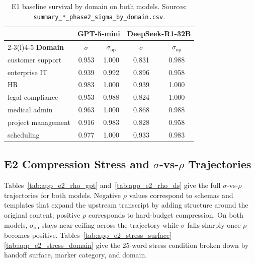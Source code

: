 \begin{table}[h]
\centering
\caption{E1 baseline survival by domain on both models. Sources: \texttt{summary\_*\_phase2\_sigma\_by\_domain.csv}.}
\label{tab:app_e1_domain}
\small
\begin{tabular}{@{}lcccc@{}}
\toprule
& \multicolumn{2}{c}{\textbf{GPT-5-mini}} & \multicolumn{2}{c}{\textbf{DeepSeek-R1-32B}} \\
\cmidrule(lr){2-3}\cmidrule(l){4-5}
\textbf{Domain} & \boldmath$\sigma$ & \boldmath$\sigma_{\mathrm{op}}$ & \boldmath$\sigma$ & \boldmath$\sigma_{\mathrm{op}}$ \\
\midrule
customer support   & 0.953 & 1.000 & 0.831 & 0.988 \\
enterprise IT      & 0.939 & 0.992 & 0.896 & 0.958 \\
HR                 & 0.983 & 1.000 & 0.939 & 1.000 \\
legal compliance   & 0.953 & 0.988 & 0.824 & 1.000 \\
medical admin      & 0.963 & 1.000 & 0.868 & 0.988 \\
project management & 0.916 & 0.983 & 0.828 & 0.958 \\
scheduling         & 0.977 & 1.000 & 0.933 & 0.983 \\
\bottomrule
\end{tabular}
\end{table}

\subsection{E2 Compression Stress and $\sigma$-vs-$\rho$ Trajectories}
\label{app:e2}

Tables~\ref{tab:app_e2_rho_gpt} and~\ref{tab:app_e2_rho_ds} give the full $\sigma$-vs-$\rho$ trajectories for both models. Negative $\rho$ values correspond to schemas and templates that expand the upstream transcript by adding structure around the original content; positive $\rho$ corresponds to hard-budget compression. On both models, $\sigma_{\mathrm{op}}$ stays near ceiling across the trajectory while $\sigma$ falls sharply once $\rho$ becomes positive. Tables~\ref{tab:app_e2_stress_surface}--\ref{tab:app_e2_stress_domain} give the 25-word stress condition broken down by handoff surface, marker category, and domain.

